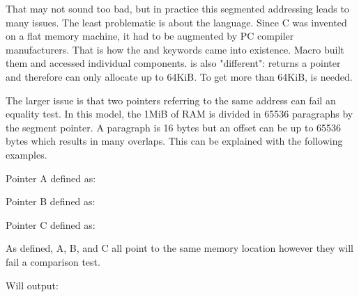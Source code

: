 \documentclass[book.tex]{subfiles}
\begin{document}
That may not sound too bad, but in practice this segmented addressing leads to many issues.
The least problematic is about the language. Since C was invented on a flat memory machine, it had to be augmented by PC compiler manufacturers. That is how the  and  keywords came into existence. Macro  built them and  accessed individual components.  is also "different":  returns a  pointer and therefore can only allocate up to 64KiB. To get more than 64KiB,  is needed.\\
\par
The larger issue is that two pointers referring to the same address can fail an equality test. In this model, the 1MiB of RAM is divided in 65536 paragraphs by the segment pointer. A paragraph is 16 bytes but an offset can be up to 65536 bytes which results in many overlaps. This can be explained with the following examples.\\
\par
Pointer A defined as:\\
\par
\begin{minipage}{\textwidth}

\end{minipage}

\bigskip

Pointer B defined as:\\
\par
\begin{minipage}{\textwidth}

\end{minipage}

\bigskip

Pointer C defined as:\\
\par
\begin{minipage}{\textwidth}

\end{minipage}

As defined, A, B, and C all point to the same memory location however they will fail a comparison test.\\

\begin{minipage}{\textwidth}

\end{minipage}
\par
Will output:\\
\end{document}
